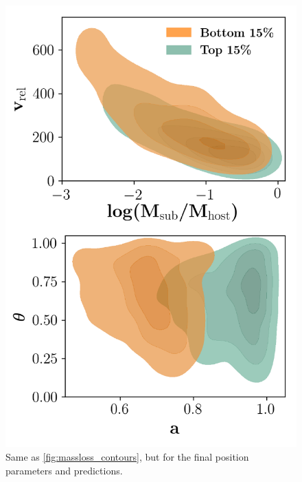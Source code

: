 \documentclass[fleqn,usenatbib]{mnras}
\begin{document}
\begin{figure}
	\includegraphics[width=\columnwidth]{Figures/position_contours}
	\vspace{-20pt}
    \caption{Same as \ref{fig:massloss_contours}, but for the final position parameters and predictions.}
    \label{fig:position_contours}
\end{figure}
\end{document}
